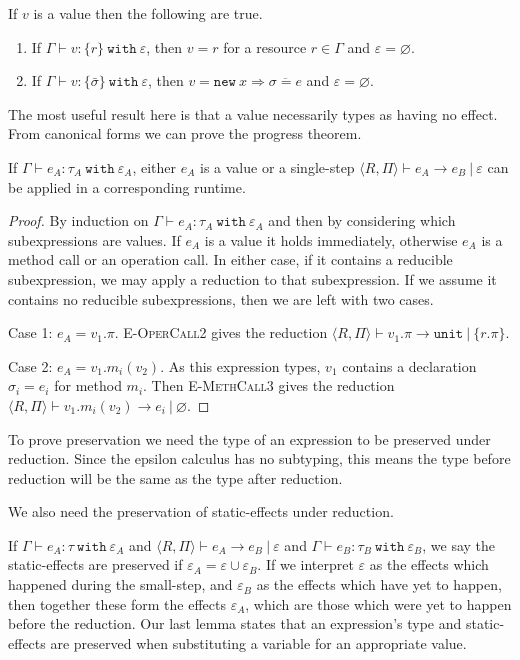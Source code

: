 \documentclass[a4paper,UKenglish]{lipics-v2016}
\newcommand{\kw}[1]{\mathtt{ #1 }~}
\newcommand{\kwa}[1]{\mathtt{ #1 }}
\newcommand{\newbasic}[0]{
	\kwa{new}~x \Rightarrow \overline{\sigma = e}
}
\newcommand{\rctx}[0]{ \langle R, \Pi \rangle }
\begin{document}
\begin{lemma}
If $v$ is a value then the following are true.
\begin{enumerate} 
	\item If $\Gamma \vdash v:\{ r \}~\kw{with} \varepsilon$, then $v = r$ for a resource $r \in \Gamma$ and $\varepsilon = \varnothing$.
	\item If $\Gamma \vdash v: \{ \bar \sigma \}~\kw{with} \varepsilon$, then $v = \newbasic$ and $\varepsilon = \varnothing$.
\end{enumerate}
\end{lemma}

\noindent
The most useful result here is that a value necessarily types as having no effect. From canonical forms we can prove the progress theorem.

\begin{theorem}[Progress]
If $\Gamma \vdash e_A: \tau_A~\kw{with} \varepsilon_A$, either $e_A$ is a value or a single-step $\rctx \vdash e_A \longrightarrow e_B~|~\varepsilon$ can be applied in a corresponding runtime.
\end{theorem}

\begin{proof}
By induction on $\Gamma \vdash e_A: \tau_A~\kw{with} \varepsilon_A$ and then by considering which subexpressions are values. If $e_A$ is a value it holds immediately, otherwise $e_A$ is a method call or an operation call. In either case, if it contains a reducible subexpression, we may apply a reduction to that subexpression. If we assume it contains no reducible subexpressions, then we are left with two cases.

Case 1: $e_A = v_1.\pi$. \textsc{E-OperCall2} gives the reduction $\rctx \vdash v_1.\pi \longrightarrow \kwa{unit}~|~\{ r.\pi \}$.

Case 2: $e_A = v_1.m_i(v_2)$. As this expression types, $v_1$ contains a declaration $\sigma_i = e_i$ for method $m_i$. Then \textsc{E-MethCall3} gives the reduction $\rctx \vdash v_1.m_i(v_2) \longrightarrow e_i~|~\varnothing$. 
\end{proof}

\noindent
To prove preservation we need the type of an expression to be preserved under reduction. Since the epsilon calculus has no subtyping, this means the type before reduction will be the same as the type after reduction.

We also need the preservation of static-effects under reduction.

If $\Gamma \vdash e_A: \tau~\kw{with} \varepsilon_A$ and $\rctx \vdash e_A \longrightarrow e_B~|~\varepsilon$ and $\Gamma \vdash e_B: \tau_B~\kw{with} \varepsilon_B$, we say the static-effects are preserved if $\varepsilon_A = \varepsilon \cup \varepsilon_B$. If we interpret $\varepsilon$ as the effects which happened during the small-step, and $\varepsilon_B$ as the effects which have yet to happen, then together these form the effects $\varepsilon_A$, which are those which were yet to happen before the reduction. Our last lemma states that an expression's type and static-effects are preserved when substituting a variable for an appropriate value.
\end{document}
